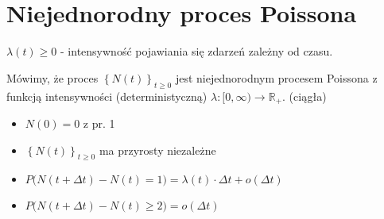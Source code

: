 \section{Niejednorodny proces Poissona}
$ \lambda(t)\ge0  $ - intensywność pojawiania się zdarzeń zależny od czasu.
\begin{defi}
Mówimy, że proces $ \left\{N(t)\right\}_{t\ge 0} $ jest niejednorodnym procesem Poissona z funkcją intensywności (deterministyczną) $ \lambda:[0,\infty )\to \mathbb R _+ $. (ciągła)
\begin{itemize}
\item $ N(0)=0 $ z pr. 1
\item $ \left\{N(t)\right\}_{t\ge 0} $ ma przyrosty niezależne
\item $ P\bigl(N(t+\Delta t)-N(t)=1\bigr)=\lambda(t)\cdot\Delta t+o(\Delta t) $
\item $ P\bigl(N(t+\Delta t)-N(t)\ge2\bigr)=o(\Delta t) $
\end{itemize}
\end{defi}

